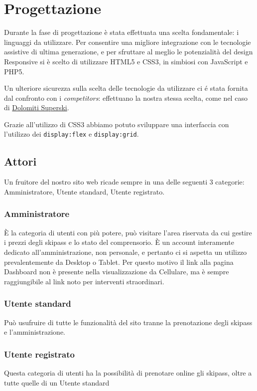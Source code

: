 \section{Progettazione}
Durante la fase di progettazione è stata effettuata una scelta fondamentale: i linguaggi da utilizzare. Per consentire una migliore integrazione con le tecnologie assistive di ultima generazione, e per sfruttare al meglio le potenzialità del design Responsive
si è scelto di utilizzare HTML5 e CSS3, in simbiosi con JavaScript e PHP5.

Un ulteriore sicurezza sulla scelta delle tecnologie da utilizzare ci é stata fornita dal confronto con i \textit{competitors}: effettuano la nostra stessa scelta, come nel caso di \href{www.dolomitisuperski.com}{Dolomiti Superski}.

Grazie all'utilizzo di CSS3 abbiamo potuto sviluppare una interfaccia con l'utilizzo dei \verb|display:flex| e \verb|display:grid|.


\subsection{Attori}
Un fruitore del nostro sito web ricade sempre in una delle seguenti 3 categorie: Amministratore, Utente standard, Utente registrato.
\subsubsection{Amministratore}
È la categoria di utenti con più potere, può visitare l'area riservata da cui gestire i prezzi degli skipass e lo stato del comprensorio.
È un account interamente dedicato all'amministrazione, non personale, e pertanto ci si aspetta un utilizzo prevalentemente da Desktop o Tablet. Per questo motivo il link alla pagina Dashboard non è presente nella visualizzazione da Cellulare, ma è sempre raggiungibile al link noto per interventi straordinari.
\subsubsection{Utente standard}
Può usufruire di tutte le funzionalità del sito tranne la prenotazione degli skipass e l'amministrazione.
\subsubsection{Utente registrato}
Questa categoria di utenti ha la possibilità di prenotare online gli skipass, oltre a tutte quelle di un Utente standard

